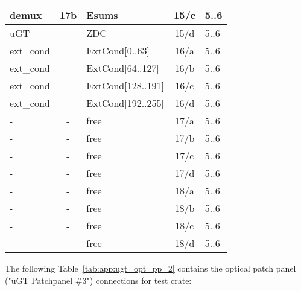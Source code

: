 \begin{longtable}{|l|c|l|c|l|}
demux & 17b & Esums      & 15/c & 5..6 \\\hline
uGT &    & ZDC      & 15/d & 5..6 \\\hline
ext\_cond &     & ExtCond[0..63]    & 16/a & 5..6 \\\hline
ext\_cond &     & ExtCond[64..127]  & 16/b & 5..6 \\\hline
ext\_cond &     & ExtCond[128..191] & 16/c & 5..6 \\\hline
ext\_cond &     & ExtCond[192..255] & 16/d & 5..6 \\\hline
- & - & free & 17/a & 5..6 \\\hline
- & - & free & 17/b & 5..6 \\\hline
- & - & free & 17/c & 5..6 \\\hline
- & - & free & 17/d & 5..6 \\\hline
- & - & free & 18/a & 5..6 \\\hline
- & - & free & 18/b & 5..6 \\\hline
- & - & free & 18/c & 5..6 \\\hline
- & - & free & 18/d & 5..6 \\\hline
\end{longtable}

The following Table~\ref{tab:app:ugt_opt_pp_2} contains the optical patch panel ("uGT Patchpanel \#3") connections for test crate:

